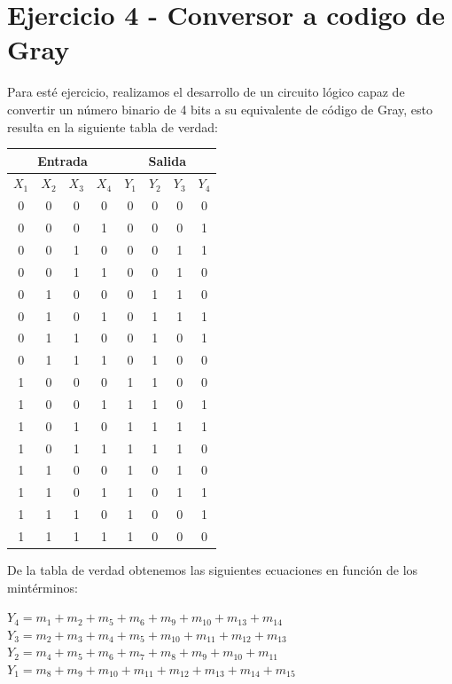 \section{Ejercicio 4 - Conversor a codigo de Gray}
Para esté ejercicio, realizamos el desarrollo de un circuito lógico capaz de convertir un número binario de 4 bits a su equivalente de código de Gray, esto resulta en la siguiente tabla de verdad:
\begin{table}[H]
	\begin{center}
		\begin{tabular}{|c|c|c|c||c|c|c|c|}
			\hline
			\multicolumn{4}{|c||}{Entrada} & \multicolumn{4}{|c|}{Salida}\\
			\hline
			$X_1$ &	$X_2$ &	$X_3$ &	$X_4$ & $Y_1$ & $Y_2$ & $Y_3$ & $Y_4$\\
			\hline
			0 & 0 & 0 & 0 & 0 & 0 & 0 & 0\\
			\hline
			0 & 0 & 0 & 1 & 0 & 0 & 0 & 1\\
			\hline
			0 & 0 & 1 & 0 & 0 & 0 & 1 & 1\\
			\hline
			0 & 0 & 1 & 1 & 0 & 0 & 1 & 0\\
			\hline
			0 & 1 & 0 & 0 & 0 & 1 & 1 & 0\\
			\hline
			0 & 1 & 0 & 1 & 0 & 1 & 1 & 1\\
			\hline
			0 & 1 & 1 & 0 & 0 & 1 & 0 & 1\\
			\hline
			0 & 1 & 1 & 1 & 0 & 1 & 0 & 0\\
			\hline
			1 & 0 & 0 & 0 & 1 & 1 & 0 & 0\\
			\hline
			1 & 0 & 0 & 1 & 1 & 1 & 0 & 1\\
			\hline
			1 & 0 & 1 & 0 & 1 & 1 & 1 & 1\\
			\hline
			1 & 0 & 1 & 1 & 1 & 1 & 1 & 0\\
			\hline
			1 & 1 & 0 & 0 & 1 & 0 & 1 & 0\\
			\hline
			1 & 1 & 0 & 1 & 1 & 0 & 1 & 1\\
			\hline
			1 & 1 & 1 & 0 & 1 & 0 & 0 & 1\\
			\hline
			1 & 1 & 1 & 1 & 1 & 0 & 0 & 0\\
			\hline
		\end{tabular}
	\end{center}
\end{table}
De la tabla de verdad obtenemos las siguientes ecuaciones en función de los mintérminos:
\begin{center}
	$Y_4=m_1+m_2+m_5+m_6+m_9+m_{10}+m_{13}+m_{14}$\\
	$Y_3=m_2+m_3+m_4+m_5+m_{10}+m_{11}+m_{12}+m_{13}$\\
	$Y_2=m_4+m_5+m_6+m_7+m_8+m_9+m_{10}+m_{11}$\\
	$Y_1=m_8+m_9+m_{10}+m_{11}+m_{12}+m_{13}+m_{14}+m_{15}$\\
\end{center}
